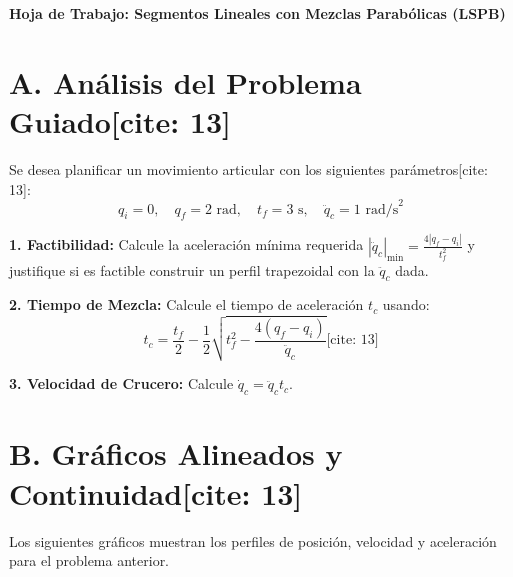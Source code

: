 \documentclass[11pt, a4paper]{article}
\begin{document}
\begin{center}
    \Large\textbf{\textcolor{ucbblue}{Hoja de Trabajo: Segmentos Lineales con Mezclas Parabólicas (LSPB)}}\\[0.2cm]
\end{center}

\vspace{0.2cm}

\section*{A. Análisis del Problema Guiado[cite: 13]}
Se desea planificar un movimiento articular con los siguientes parámetros[cite: 13]:
\begin{equation*}
    q_i = 0, \quad q_f = 2\text{ rad}, \quad t_f = 3\text{ s}, \quad \ddot{q}_c = 1\text{ rad/s}^2
\end{equation*}

\textbf{1. Factibilidad:} Calcule la aceleración mínima requerida $|\ddot{q}_c|_{\min} = \frac{4|q_f - q_i|}{t_f^2}$ y justifique si es factible construir un perfil trapezoidal con la $\ddot{q}_c$ dada.
\vspace{2cm}

\textbf{2. Tiempo de Mezcla:} Calcule el tiempo de aceleración $t_c$ usando:
\begin{equation*}
    t_c = \frac{t_f}{2} - \frac{1}{2}\sqrt{t_f^2 - \frac{4(q_f - q_i)}{\ddot{q}_c}} \text{[cite: 13]}
\end{equation*}
\vspace{2cm}

\textbf{3. Velocidad de Crucero:} Calcule $\dot{q}_c = \ddot{q}_c t_c$.
\vspace{1.5cm}

\section*{B. Gráficos Alineados y Continuidad[cite: 13]}
Los siguientes gráficos muestran los perfiles de posición, velocidad y aceleración para el problema anterior.
\vspace{0.4cm}
\end{document}
